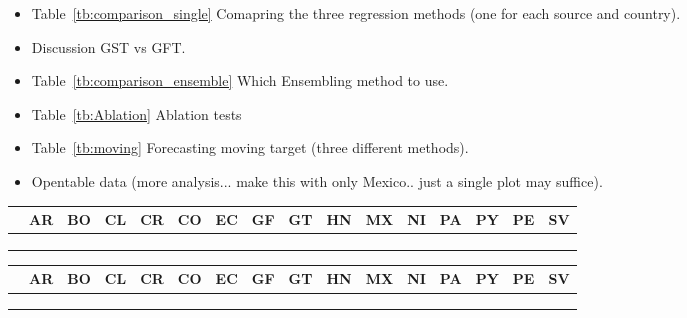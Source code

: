 \begin{itemize}
  \item Table~\ref{tb:comparison_single} Comapring the three regression methods (one for each source and country). 
  \item Discussion GST vs GFT.
  \item Table~\ref{tb:comparison_ensemble} Which Ensembling method to use.
  \item Table~\ref{tb:Ablation} Ablation tests
  \item Table~\ref{tb:moving} Forecasting moving target (three different methods).
  \item Opentable data (more analysis... make this with only Mexico.. just a single plot may suffice). 
\end{itemize}

\begin{table*}[t!]
\centering
\caption{\label{tb:comparison_single}  Comparing all results}
\begin{tabular}{|*{16}{l|}}
\hline
 & AR & BO & CL & CR & CO & EC & GF & GT & HN & MX & NI & PA & PY & PE & SV \\
\hline \hline
 &    &    &    &    &    &    &    &    &    &    &    &    &    &    &    \\
 &    &    &    &    &    &    &    &    &    &    &    &    &    &    &    \\
 &    &    &    &    &    &    &    &    &    &    &    &    &    &    &   \\
\hline
\end{tabular}
\end{table*}

\begin{table*}[t!]
  \centering
  \caption{\label{tb:comparison_ensemble}  Ensemble all results}
\begin{tabular}{|*{16}{l|}}
\hline
 & AR & BO & CL & CR & CO & EC & GF & GT & HN & MX & NI & PA & PY & PE & SV \\
\hline \hline
 &    &    &    &    &    &    &    &    &    &    &    &    &    &    &    \\
 &    &    &    &    &    &    &    &    &    &    &    &    &    &    &    \\
 &    &    &    &    &    &    &    &    &    &    &    &    &    &    &   \\
\hline
\end{tabular}
\end{table*}

